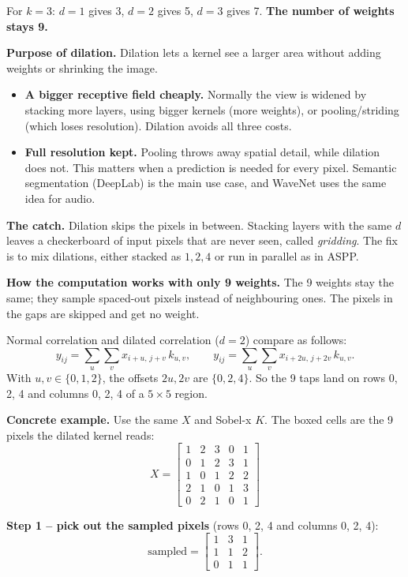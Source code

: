 For $k=3$: $d=1$ gives 3, $d=2$ gives 5, $d=3$ gives 7. \textbf{The number of weights stays 9.}

\textbf{Purpose of dilation.} Dilation lets a kernel see a larger area without adding weights or shrinking the image.
\begin{itemize}
  \item \textbf{A bigger receptive field cheaply.} Normally the view is widened by stacking more layers, using bigger kernels (more weights), or pooling/striding (which loses resolution). Dilation avoids all three costs.
  \item \textbf{Full resolution kept.} Pooling throws away spatial detail, while dilation does not. This matters when a prediction is needed for every pixel. Semantic segmentation (DeepLab) is the main use case, and WaveNet uses the same idea for audio.
\end{itemize}

\textbf{The catch.} Dilation skips the pixels in between. Stacking layers with the same $d$ leaves a checkerboard of input pixels that are never seen, called \emph{gridding}. The fix is to mix dilations, either stacked as $1,2,4$ or run in parallel as in ASPP.

\textbf{How the computation works with only 9 weights.} The 9 weights stay the same; they sample spaced-out pixels instead of neighbouring ones. The pixels in the gaps are skipped and get no weight.

Normal correlation and dilated correlation ($d=2$) compare as follows:
\[
y_{ij}=\sum_{u}\sum_{v} x_{i+u,\,j+v}\,k_{u,v},
\qquad
y_{ij}=\sum_{u}\sum_{v} x_{i+2u,\,j+2v}\,k_{u,v}.
\]
With $u,v\in\{0,1,2\}$, the offsets $2u,2v$ are $\{0,2,4\}$. So the 9 taps land on rows 0, 2, 4 and columns 0, 2, 4 of a $5\times5$ region.

\textbf{Concrete example.} Use the same $X$ and Sobel-x $K$. The boxed cells are the 9 pixels the dilated kernel reads:
\[
X=\begin{bmatrix}
\boxed{1}&2&\boxed{3}&0&\boxed{1}\\
0&1&2&3&1\\
\boxed{1}&0&\boxed{1}&2&\boxed{2}\\
2&1&0&1&3\\
\boxed{0}&2&\boxed{1}&0&\boxed{1}
\end{bmatrix}
\]

\textbf{Step 1 -- pick out the sampled pixels} (rows 0, 2, 4 and columns 0, 2, 4):
\[
\text{sampled}=\begin{bmatrix}1&3&1\\1&1&2\\0&1&1\end{bmatrix}.
\]

